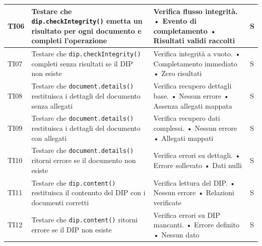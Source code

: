 \documentclass[a4paper,12pt]{article}
\begin{document}
\begin{longtable}{|M{1.2cm}|M{6.3cm}|M{5cm}|M{1.5cm}|}
            TI06 & Testare che \texttt{dip.checkIntegrity()} emetta un risultato per ogni documento e completi l'operazione & Verifica flusso integrità. \newline • Evento di completamento \newline • Risultati validi raccolti & S \\ \hline
            
            TI07 & Testare che \texttt{dip.checkIntegrity()} completi senza risultati se il DIP non esiste & Verifica integrità a vuoto. \newline • Completamento immediato \newline • Zero risultati & S \\ \hline
            
            TI08 & Testare che \texttt{document.details()} restituisca i dettagli del documento senza allegati & Verifica recupero dettagli base. \newline • Nessun errore \newline • Assenza allegati mappata & S \\ \hline
            
            TI09 & Testare che \texttt{document.details()} restituisca i dettagli del documento con allegati & Verifica recupero dati complessi. \newline • Nessun errore \newline • Allegati mappati & S \\ \hline
            
            TI10 & Testare che \texttt{document.details()} ritorni errore se il documento non esiste & Verifica errori su dettagli. \newline • Errore sollevato \newline • Dati nulli & S \\ \hline
            
            TI11 & Testare che \texttt{dip.content()} restituisca il contenuto del DIP con i documenti corretti & Verifica lettura del DIP. \newline • Nessun errore \newline • Relazioni verificate & S \\ \hline
            
            TI12 & Testare che \texttt{dip.content()} ritorni errore se il DIP non esiste & Verifica errori su DIP mancanti. \newline • Errore definito \newline • Nessun dato & S \\ \hline
            

\end{longtable}
\end{document}
